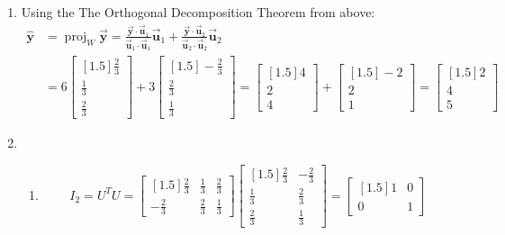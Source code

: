 \documentclass[letter,11pt]{article}
\theoremstyle{definition}
\begin{document}
\begin{tcolorbox}[boxrule=1mm,before=\hfill,after=\hfill,adjusted title={Problem 4 solutions}]
\begin{enumerate}[label=\roman*.]
    \item Using the The Orthogonal Decomposition Theorem from above: 
    \begin{align*}
        \hat{\boldsymbol{y}} &= \operatorname{proj}_{W} \vec{\boldsymbol{y}} = \frac{\vec{\boldsymbol{y}}\cdot \vec{\boldsymbol{u}}_{1}}{\vec{\boldsymbol{u}}_{1} \cdot \vec{\boldsymbol{u}}_{1}}\vec{\boldsymbol{u}}_{1} + \frac{\vec{\boldsymbol{y}}\cdot \vec{\boldsymbol{u}}_{2}}{\vec{\boldsymbol{u}}_{2} \cdot \vec{\boldsymbol{u}}_{2}}\vec{\boldsymbol{u}}_{2}\\
        &= 6\begin{bmatrix}[1.5] \frac{2}{3} \\ \frac{1}{3} \\ \frac{2}{3} \end{bmatrix} + 3\begin{bmatrix}[1.5] -\frac{2}{3} \\ \frac{2}{3} \\ \frac{1}{3} \end{bmatrix} = \begin{bmatrix}[1.5] 4 \\ 2 \\ 4 \end{bmatrix} + \begin{bmatrix}[1.5] -2 \\ 2 \\ 1 \end{bmatrix} = \begin{bmatrix}[1.5] 2 \\ 4 \\ 5 \end{bmatrix}
    \end{align*}
    \item 
        \begin{enumerate}[label = (\alph*.)]
            \item $$I_{2}=U^{T}U = \begin{bmatrix}[1.5] \frac{2}{3} & \frac{1}{3} & \frac{2}{3}\\-\frac{2}{3} & \frac{2}{3} & \frac{1}{3}  \end{bmatrix} \begin{bmatrix}[1.5] \frac{2}{3} & -\frac{2}{3}\\ \frac{1}{3} & \frac{2}{3}\\ \frac{2}{3} & \frac{1}{3}\end{bmatrix} = \begin{bmatrix}[1.5] 1 & 0 \\ 0 & 1\end{bmatrix}$$

\end{enumerate}
\end{enumerate}
\end{tcolorbox}
\end{document}
